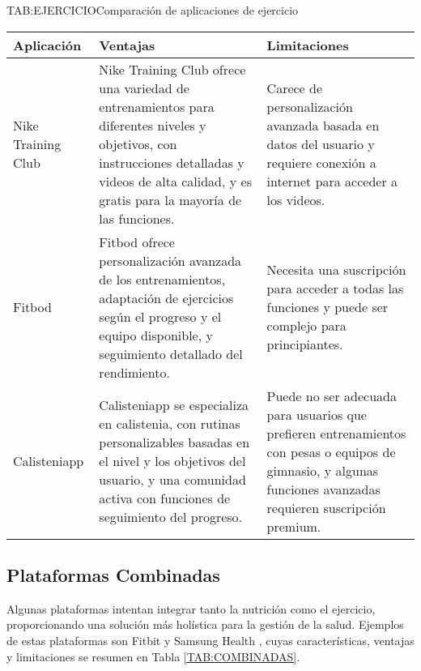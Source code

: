 \begin{table}[Comparación de aplicaciones de ejercicio]{TAB:EJERCICIO}{Comparación de aplicaciones de ejercicio}
  \begin{tabular}{|p{3cm}|p{5cm}|p{5cm}|}
    \hline
    \textbf{Aplicación} & \textbf{Ventajas} & \textbf{Limitaciones} \\
    \hline
    Nike Training Club & Nike Training Club ofrece una variedad de entrenamientos para diferentes niveles y objetivos, con instrucciones detalladas y videos de alta calidad, y es gratis para la mayoría de las funciones. & Carece de personalización avanzada basada en datos del usuario y requiere conexión a internet para acceder a los videos. \\
    \hline
    Fitbod & Fitbod ofrece personalización avanzada de los entrenamientos, adaptación de ejercicios según el progreso y el equipo disponible, y seguimiento detallado del rendimiento. & Necesita una suscripción para acceder a todas las funciones y puede ser complejo para principiantes. \\
    \hline
    Calisteniapp & Calisteniapp se especializa en calistenia, con rutinas personalizables basadas en el nivel y los objetivos del usuario, y una comunidad activa con funciones de seguimiento del progreso. & Puede no ser adecuada para usuarios que prefieren entrenamientos con pesas o equipos de gimnasio, y algunas funciones avanzadas requieren suscripción premium. \\
    \hline
  \end{tabular}
\end{table}

\subsection{Plataformas Combinadas}

Algunas plataformas intentan integrar tanto la nutrición como el ejercicio, proporcionando una solución más holística para la gestión de la salud. Ejemplos de estas plataformas son Fitbit \cite{Fitbit} y Samsung Health \cite{SamsungHealth}, cuyas características, ventajas y limitaciones se resumen en Tabla \ref{TAB:COMBINADAS}.

